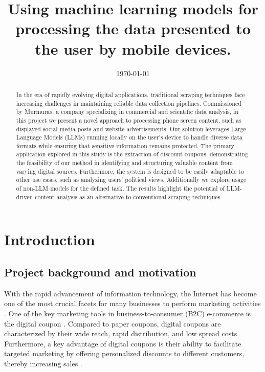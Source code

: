 \documentclass[licencjacka,en]{pracamgr}
\title{Using machine learning models for processing the data presented to the user by mobile devices.}
\date{\today}
\begin{document}
\maketitle

\begin{abstract}
In the era of rapidly evolving digital applications, traditional scraping techniques face increasing challenges in maintaining reliable data collection pipelines. Commissioned by Murmuras, a company specializing in commercial and scientific data analysis, in this project we present a novel approach to processing phone screen content, such as displayed social media posts and website advertisements. Our solution leverages Large Language Models (LLMs) running locally on the user's device to handle diverse data formats while ensuring that sensitive information remains protected. The primary application explored in this study is the extraction of discount coupons, demonstrating the feasibility of our method in identifying and structuring valuable content from varying digital sources. Furthermore, the system is designed to be easily adaptable to other use cases, such as analyzing users' political views. Additionally we explore usage of non-LLM models for the defined task. The results highlight the potential of LLM-driven content analysis as an alternative to conventional scraping techniques.
\raggedright
\end{abstract}

\tableofcontents
\listoffigures
\listoftables

\chapter{Introduction}

\section{Project background and motivation}
With the rapid advancement of information technology, the Internet has become one of the most crucial facets for many businesses to perform marketing activities \cite{design_of_coupons}. One of the key marketing tools in business-to-consumer (B2C) e-commerce is the digital coupon \cite{targeted_reminders}. Compared to paper coupons, digital coupons are characterized by their wide reach, rapid distribution, and low spread costs. Furthermore, a key advantage of digital coupons is their ability to facilitate targeted marketing by offering personalized discounts to different customers, thereby increasing sales \cite{design_of_coupons}.
\end{document}
